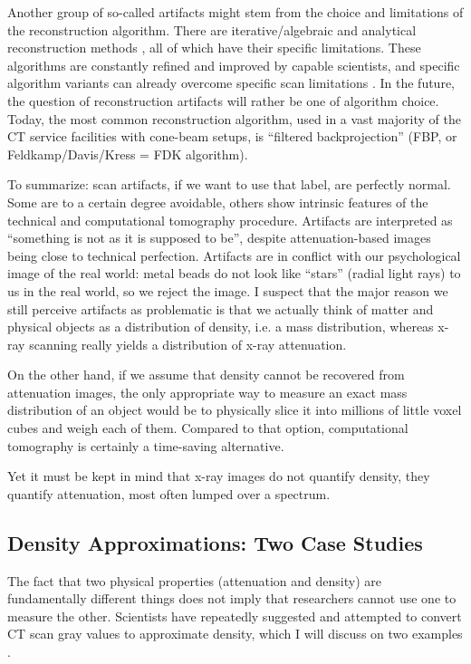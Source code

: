 Another group of so-called artifacts might stem from the choice and limitations of the reconstruction algorithm.
There are iterative/algebraic and analytical reconstruction methods \citep{Gilbert1972,Andersen1984,Feldkamp1984,Geyer2015,Hansen2021}, all of which have their specific limitations.
These algorithms are constantly refined and improved by capable scientists, and specific algorithm variants can already overcome specific scan limitations \citep[e.g.][]{Six2019,Frenkel2022}.
In the future, the question of reconstruction artifacts will rather be one of algorithm choice.
Today, the most common reconstruction algorithm, used in a vast majority of the CT service facilities with cone-beam setups, is ``filtered backprojection'' (FBP, or Feldkamp/Davis/Kress = FDK algorithm).


To summarize: scan artifacts, if we want to use that label, are perfectly normal.
Some are to a certain degree avoidable, others show intrinsic features of the technical and computational tomography procedure.
Artifacts are interpreted as ``something is not as it is supposed to be'', despite attenuation-based images being close to technical perfection.
Artifacts are in conflict with our psychological image of the real world: metal beads do not look like ``stars'' (radial light rays) to us in the real world, so we reject the image.
I suspect that the major reason we still perceive artifacts as problematic is that we actually think of matter and physical objects as a distribution of density, i.e. a mass distribution, whereas x-ray scanning really yields a distribution of x-ray attenuation.

On the other hand, if we assume that density cannot be recovered from attenuation images, the only appropriate way to measure an exact mass distribution of an object would be to physically slice it into millions of little voxel cubes and weigh each of them.
Compared to that option, computational tomography is certainly a time-saving alternative.


Yet it must be kept in mind that x-ray images do not quantify density, they quantify attenuation, most often lumped over a spectrum.


\subsection{Density Approximations: Two Case Studies}
\label{sec:orge177b53}
The fact that two physical properties (attenuation and density) are fundamentally different things does not imply that researchers cannot use one to measure the other.
Scientists have repeatedly suggested and attempted to convert CT scan gray values to approximate density, which I will discuss on two examples \citep{DuPlessis2013,Durston2022}.


